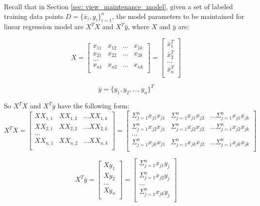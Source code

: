 Recall that in Section \ref{sec: view_maintenance_model}, given a set of labeled training data points $D = \{\bar{x}_i, y_i\}_{i=1}^n$, the model parameters to be maintained for linear regression model are $X^TX$ and $X^T\bar{y}$, where $X$ and $\bar{y}$ are:

\begin{equation}
    X=\begin{bmatrix}
x_{11} & x_{12} &\dots &x_{1k}\\
x_{21} & x_{22} &\dots &x_{2k}\\
\dots\\
x_{n1} & x_{n2} &\dots &x_{nk}\\
\end{bmatrix}
=\begin{bmatrix}
\bar{x}_1^T\\
\bar{x}_2^T\\
\dots\\
\bar{x}_n^T\\
\end{bmatrix}
\end{equation}


\begin{equation}
    \bar{y} = \{y_1, y_2,\dots, y_n\}^T
\end{equation}

So $X^TX$ and $X^T\bar{y}$ have the following form:
\begin{equation}
    X^TX=\begin{bmatrix}
XX_{1,1} & XX_{1,2} &\dots XX_{1,k}\\
XX_{2,1} & XX_{2,2} &\dots XX_{2,k}\\
\dots\\
XX_{n,1} & XX_{n,2} &\dots XX_{n,k}\\
\end{bmatrix}=\begin{bmatrix}
\Sigma_{j=1}^nx_{j1}x_{j1} & \Sigma_{j=1}^nx_{j1}x_{j2} &\dots \Sigma_{j=1}^nx_{j1}x_{jk}\\
\Sigma_{j=1}^nx_{j2}x_{j1} & \Sigma_{j=1}^nx_{j2}x_{j2} &\dots \Sigma_{j=1}^nx_{j2}x_{jk}\\
\dots\\
\Sigma_{j=1}^nx_{jk}x_{j1} & \Sigma_{j=1}^nx_{jk}x_{j2} &\dots \Sigma_{j=1}^nx_{jk}x_{jk}\\
\end{bmatrix}
\end{equation}

\begin{equation}
    X^T\bar{y}=\begin{bmatrix}
Xy_{1}\\
Xy_{2}\\
\dots\\
Xy_{n}\\
\end{bmatrix}=\begin{bmatrix}
\Sigma_{j=1}^nx_{j1}y_{j}\\
\Sigma_{j=1}^nx_{j2}y_{j}\\
\dots\\
\Sigma_{j=1}^nx_{jk}y_{j}\\
\end{bmatrix}
\end{equation}

